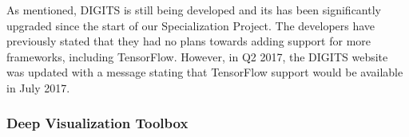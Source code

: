 \noindent As mentioned, DIGITS is still being developed and its has been significantly upgraded since the start of our Specialization Project. The developers have previously stated that they had no plans towards adding support for more frameworks, including TensorFlow. However, in Q2 2017, the DIGITS website was updated with a message stating that TensorFlow support would be available in July 2017.

\begin{comment}
Drawbacks:
- Still does not support Keras.
- No advanced visualizations.
\end{comment}

\subsubsection{Deep Visualization Toolbox}

\begin{comment}
\textit{The Deep Visualization Toolbox \cite{yosinski-deepvis} is a software tool that provides an interactive visualization of a trained artificial convolutional neural network as the network responds to user-provided input, either an uploaded image or video from a live webcam feed. The toolbox is developed for networks created in Caffe. It comes with a default network, but also includes the possibility of adapting your own networks. Users can view the filters of a selected layer, either as actual activations or as images synthesized to produce high activations through deep visualization. A specific neuron can be selected to explore further. This will show deep visualizations, the top nine images from the training set that activates the filter the most, and the pixels from those images most responsible for the high activations, computed via the deconvolution technique. Note that these last three visualizations are pre computed instead of computed in real time, since they are far too expensive to run live.}
\end{comment}

